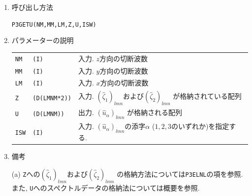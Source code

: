 \documentclass[a4j,fleqn]{jarticle}
\begin{document}
\begin{enumerate}
本サブルーチンは,
$(\hat{\zeta}_1)_{lmn}$および$(\hat{\zeta}_2)_{lmn}$
を入力として, $(\hat{u}_{\alpha})_{lmn}$ (ただし$\alpha$は $1,2,3$のいずれか)
を求めるものである.

\item 呼び出し方法

{\tt P3GETU(NM,MM,LM,Z,U,ISW)}
  
\item パラメーターの説明

\begin{tabular}{lll}
{\tt NM} & {\tt (I)} & 入力. $z$方向の切断波数\\
{\tt MM} & {\tt (I)} & 入力. $y$方向の切断波数\\
{\tt LM} & {\tt (I)} & 入力. $x$方向の切断波数\\
{\tt Z} & {\tt (D(LMNM*2))} &
 入力. $(\hat{\zeta}_1)_{lmn}$および$(\hat{\zeta}_2)_{lmn}$
  が格納されている配列\\
{\tt U} & {\tt (D(LMNM))} &
 出力. $(\hat{u}_{\alpha})_{lmn}$
  が格納される配列\\
{\tt ISW} & {\tt (I)} & 入力. $(\hat{u}_{\alpha})_{lmn}$の添字$\alpha$
($1,2,3$のいずれか)を指定する.
\end{tabular}

\item 備考

(a) {\tt Z}への$(\hat{\zeta}_1)_{lmn}$および$(\hat{\zeta}_2)_{lmn}$
の格納方法については{\tt P3ELNL}の項を参照.
また, {\tt U}へのスペクトルデータの格納法については概要を参照.

\end{enumerate}
\end{document}

